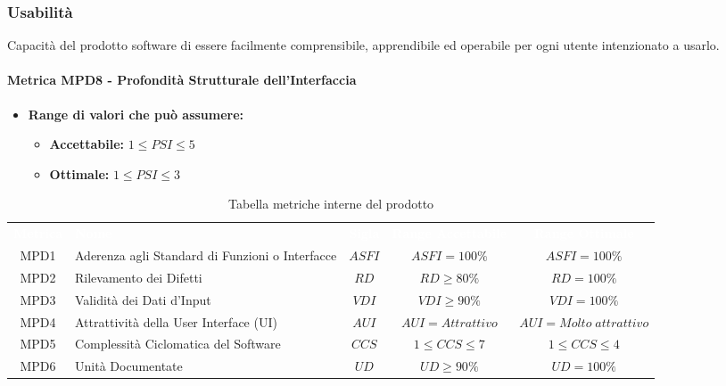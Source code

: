 \subsubsection{Usabilità}
Capacità del prodotto software di essere facilmente comprensibile, apprendibile ed operabile per ogni utente intenzionato a usarlo.

\paragraph{Metrica MPD8 - Profondità Strutturale dell'Interfaccia}
\begin{itemize}
    \item \textbf{Range di valori che può assumere:}
    \begin{itemize}
        \item \textbf{Accettabile:} $1 \leq PSI \leq 5$
        \item \textbf{Ottimale:} $1 \leq PSI \leq 3$
    \end{itemize}
\end{itemize}

\renewcommand{\arraystretch}{1.5}
\begin{longtable}{ c C{4cm} c c c}
\caption{Tabella metriche interne del prodotto}\\
\textcolor{white}{\textbf{Metrica}} & \textcolor{white}{\textbf{Nome}} & \textcolor{white}{\textbf{Sigla}} & \textcolor{white}{\textbf{Range Accettabile}} & \textcolor{white}{\textbf{Range Ottimale}}\\
    MPD1 & Aderenza agli Standard di Funzioni o Interfacce & $ASFI$ & $ASFI = 100\%$ & $ASFI = 100\%$\\
    MPD2 & Rilevamento dei Difetti & $RD$ & $ RD \geq 80\% $ & $RD = 100\%$\\
    MPD3 & Validità dei Dati d'Input & $VDI$ &  $VDI \geq 90\%$ &  $VDI = 100\%$\\
    MPD4 & Attrattività della User Interface (UI) & $AUI$ & $AUI = Attrattivo$ &  $AUI = Molto \; attrattivo$\\
    MPD5 & Complessità Ciclomatica del Software & $CCS $ & $1 \leq CCS \leq 7 $ & $1 \leq CCS \leq 4$\\
    MPD6 & Unità Documentate & $UD$ & $UD \geq 90\%$ & $UD = 100\%$\\
\end{longtable} 

